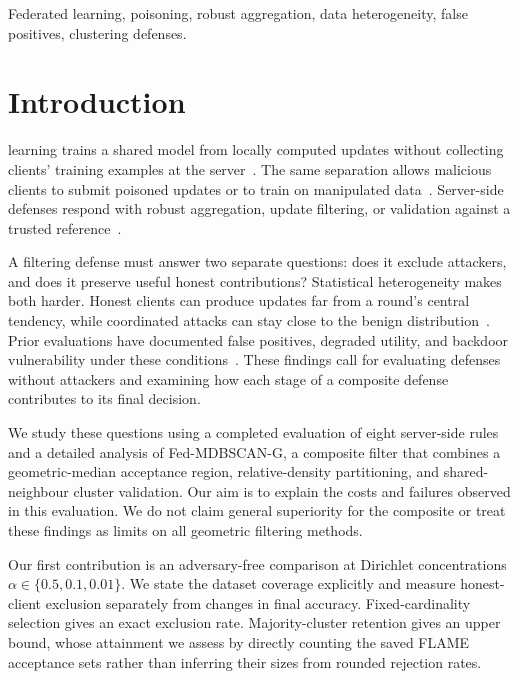\documentclass[journal]{IEEEtran}
\newcommand{\method}{Fed-MDBSCAN-G}
\begin{document}
\begin{IEEEkeywords}
Federated learning, poisoning, robust aggregation, data heterogeneity, false positives, clustering defenses.
\end{IEEEkeywords}
\IEEEpeerreviewmaketitle

\section{Introduction}
 learning trains a shared model from locally computed updates without collecting clients' training examples at the server~\cite{mcmahan2017}. The same separation allows malicious clients to submit poisoned updates or to train on manipulated data~\cite{fang2020,bagdasaryan2020,xie2020dba}. Server-side defenses respond with robust aggregation, update filtering, or validation against a trusted reference~\cite{blanchard2017,yin2018,cao2021fltrust,nguyen2022flame}.

A filtering defense must answer two separate questions: does it exclude attackers, and does it preserve useful honest contributions? Statistical heterogeneity makes both harder. Honest clients can produce updates far from a round's central tendency, while coordinated attacks can stay close to the benign distribution~\cite{baruch2019,shejwalkar2021}. Prior evaluations have documented false positives, degraded utility, and backdoor vulnerability under these conditions~\cite{singh2023fair,ye2025illusion,bellachia2026sok}. These findings call for evaluating defenses without attackers and examining how each stage of a composite defense contributes to its final decision.

We study these questions using a completed evaluation of eight server-side rules and a detailed analysis of \method{}, a composite filter that combines a geometric-median acceptance region, relative-density partitioning, and shared-neighbour cluster validation. Our aim is to explain the costs and failures observed in this evaluation. We do not claim general superiority for the composite or treat these findings as limits on all geometric filtering methods.

Our first contribution is an adversary-free comparison at Dirichlet concentrations $\alpha\in\{0.5,0.1,0.01\}$. We state the dataset coverage explicitly and measure honest-client exclusion separately from changes in final accuracy. Fixed-cardinality selection gives an exact exclusion rate. Majority-cluster retention gives an upper bound, whose attainment we assess by directly counting the saved FLAME acceptance sets rather than inferring their sizes from rounded rejection rates.
\end{document}
